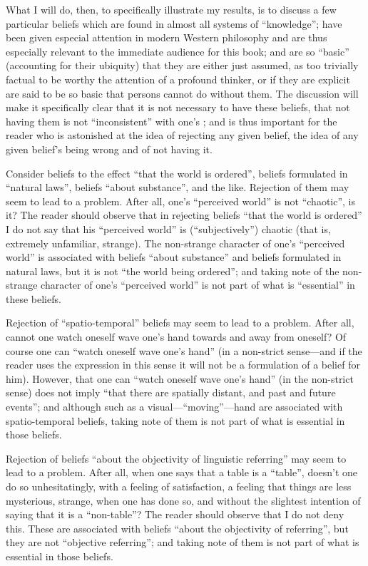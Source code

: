 What I will do, then, to specifically illustrate my results, is to discuss a few particular beliefs which are found in almost all systems of \enquote{knowledge}; have been given especial attention in modern Western philosophy and are thus especially relevant to the immediate audience for this book; and are so \enquote{basic} (accounting for their ubiquity) that they are either just assumed, as too trivially factual to be worthy the attention of a profound thinker, or if they are explicit are said to be so basic that persons cannot do without them. The discussion will make it specifically clear that it is not necessary to have these beliefs, that not having them is not \enquote{inconsistent} with one's ; and is thus important for the reader who is astonished at the idea of rejecting any given belief, the idea of any given belief's being wrong and of not having it. 

Consider beliefs to the effect \enquote{that the world is ordered}, beliefs formulated in \enquote{natural laws}, beliefs \enquote{about substance}, and the like. Rejection of them may seem to lead to a problem. After all, one's \enquote{perceived world} is not \enquote{chaotic}, is it? The reader should observe that in rejecting beliefs \enquote{that the world is ordered} I do not say that his \enquote{perceived world} is (\enquote{subjectively}) chaotic (that is, extremely unfamiliar, strange). The non-strange character of one's \enquote{perceived world} is associated with beliefs \enquote{about substance} and beliefs formulated in natural laws, but it is not \enquote{the world being ordered}; and taking note of the non-strange character of one's \enquote{perceived world} is not part of what is \enquote{essential} in these beliefs. 

Rejection of \enquote{spatio-temporal} beliefs may seem to lead to a problem. After all, cannot one watch oneself wave one's hand towards and away from oneself? Of course one can \enquote{watch oneself wave one's hand} (in a non-strict sense---and if the reader uses the expression in this sense it will not be a formulation of a belief for him). However, that one can \enquote{watch oneself wave one's hand} (in the non-strict sense) does not imply \enquote{that there are spatially distant, and past and future events}; and although  such as a visual---\enquote{moving}---hand  are associated with spatio-temporal beliefs, taking note of them is not part of what is essential in those beliefs. 

Rejection of beliefs \enquote{about the objectivity of linguistic referring} may seem to lead to a problem. After all, when one says that a table is a \enquote{table}, doesn't one do so unhesitatingly, with a feeling of satisfaction, a feeling that things are less mysterious, strange, when one has done so, and without the slightest intention of saying that it is a \enquote{non-table}? The reader should observe that I do not deny this. These  are associated with beliefs \enquote{about the objectivity of referring}, but they are not \enquote{objective referring}; and taking note of them is not part of what is essential in those beliefs. 

